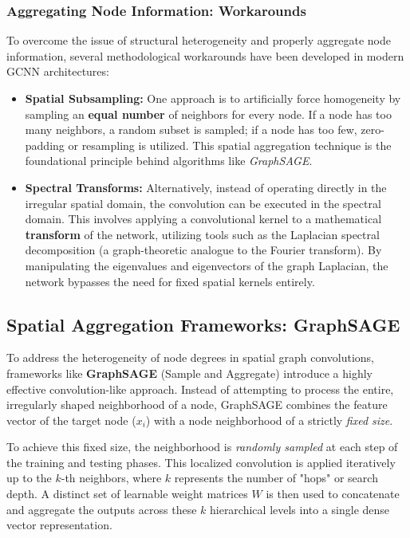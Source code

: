 \subsubsection{Aggregating Node Information: Workarounds}

To overcome the issue of structural heterogeneity and properly aggregate node information, several methodological workarounds have been developed in modern GCNN architectures:

\begin{itemize}
    \item \textbf{Spatial Subsampling:} One approach is to artificially force homogeneity by sampling an \textbf{equal number} of neighbors for every node. If a node has too many neighbors, a random subset is sampled; if a node has too few, zero-padding or resampling is utilized. This spatial aggregation technique is the foundational principle behind algorithms like \textit{GraphSAGE}.
    \item \textbf{Spectral Transforms:} Alternatively, instead of operating directly in the irregular spatial domain, the convolution can be executed in the spectral domain. This involves applying a convolutional kernel to a mathematical \textbf{transform} of the network, utilizing tools such as the Laplacian spectral decomposition (a graph-theoretic analogue to the Fourier transform). By manipulating the eigenvalues and eigenvectors of the graph Laplacian, the network bypasses the need for fixed spatial kernels entirely.
\end{itemize}

\subsection{Spatial Aggregation Frameworks: GraphSAGE}
\label{subsec:spatial_aggregation_graphsage}

To address the heterogeneity of node degrees in spatial graph convolutions, frameworks like \textbf{GraphSAGE} (Sample and Aggregate) introduce a highly effective convolution-like approach. Instead of attempting to process the entire, irregularly shaped neighborhood of a node, GraphSAGE combines the feature vector of the target node ($x_i$) with a node neighborhood of a strictly \textit{fixed size}.

To achieve this fixed size, the neighborhood is \textit{randomly sampled} at each step of the training and testing phases. This localized convolution is applied iteratively up to the $k$-th neighbors, where $k$ represents the number of "hops" or search depth. A distinct set of learnable weight matrices $W$ is then used to concatenate and aggregate the outputs across these $k$ hierarchical levels into a single dense vector representation.

